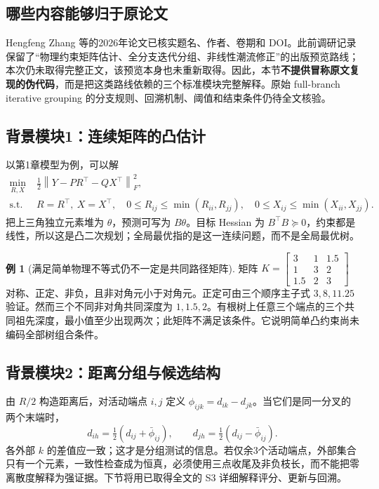 \documentclass[UTF8,11pt,fontset=fandol,openany,oneside]{ctexbook}
\newcommand{\norm}[1]{\left\lVert#1\right\rVert}
\theoremstyle{definition}
\newtheorem{example}[theorem]{例}
\theoremstyle{remark}
\numberwithin{equation}{chapter}
\begin{document}
\subsection{哪些内容能够归于原论文}
Hengfeng Zhang 等的2026年论文\citep{S2}已核实题名、作者、卷期和 DOI。此前调研记录保留了“物理约束矩阵估计、全分支迭代分组、非线性潮流修正”的出版预览路线；本次仍未取得完整正文，该预览本身也未重新取得。因此，本节\textbf{不提供冒称原文复现的伪代码}，而是把这类路线依赖的三个标准模块完整解释。原始 full-branch iterative grouping 的分支规则、回溯机制、阈值和结束条件仍待全文核验。

\subsection{背景模块1：连续矩阵的凸估计}
以第1章模型为例，可以解
\begin{align}
 \min_{R,X}\;&\tfrac12\norm{Y-PR^\top-QX^\top}_F^2,\\
 \text{s.t. }&R=R^\top,\ X=X^\top,
 \quad0\leq R_{ij}\leq\min(R_{ii},R_{jj}),
 \quad0\leq X_{ij}\leq\min(X_{ii},X_{jj}).
 \label{eq:tb-s2-generic}
\end{align}
把上三角独立元素堆为 $\theta$，预测可写为 $B\theta$。目标 Hessian 为 $B^\top B\succeq0$，约束都是线性，所以这是凸二次规划；全局最优指的是这一连续问题，而不是全局最优树。

\begin{example}[满足简单物理不等式仍不一定是共同路径矩阵]
矩阵 $K=\left[\begin{smallmatrix}3&1&1.5\\1&3&2\\1.5&2&3\end{smallmatrix}\right]$ 对称、正定、非负，且非对角元小于对角元。正定可由三个顺序主子式 $3,8,11.25$ 验证。然而三个不同非对角共同深度为 $1,1.5,2$。有根树上任意三个端点的三个共同祖先深度，最小值至少出现两次；此矩阵不满足该条件。它说明简单凸约束尚未编码全部树组合条件。
\end{example}

\subsection{背景模块2：距离分组与候选结构}
由 $R/2$ 构造距离后，对活动端点 $i,j$ 定义
$\phi_{ijk}=d_{ik}-d_{jk}$。当它们是同一分叉的两个末端时，
\begin{equation}
 d_{ih}=\tfrac12(d_{ij}+\bar\phi_{ij}),\qquad
 d_{jh}=\tfrac12(d_{ij}-\bar\phi_{ij}).
 \label{eq:tb-limb}
\end{equation}
各外部 $k$ 的差值应一致；这才是分组测试的信息。若仅余3个活动端点，外部集合只有一个元素，一致性检查成为恒真，必须使用三点收尾及非负枝长，而不能把零离散度解释为强证据。下节将用已取得全文的 S3 详细解释评分、更新与回溯。
\end{document}
